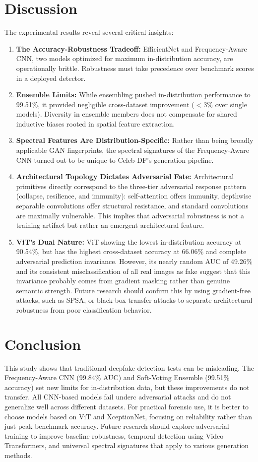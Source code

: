 \documentclass[runningheads]{llncs}
\begin{document}
\section{Discussion}
The experimental results reveal several critical insights:
\begin{enumerate}
    \item \textbf{The Accuracy-Robustness Tradeoff:} EfficientNet and Frequency-Aware CNN, two models optimized for maximum in-distribution accuracy, are operationally brittle. Robustness must take precedence over benchmark scores in a deployed detector.
    \item \textbf{Ensemble Limits:} While ensembling pushed in-distribution performance to 99.51\%, it provided negligible cross-dataset improvement ($<$3\% over single models). Diversity in ensemble members does not compensate for shared inductive biases rooted in spatial feature extraction.
    \item \textbf{Spectral Features Are Distribution-Specific:} Rather than being broadly applicable GAN fingerprints, the spectral signatures of the Frequency-Aware CNN turned out to be unique to Celeb-DF's generation pipeline.
    \item \textbf{Architectural Topology Dictates Adversarial Fate:} Architectural primitives directly correspond to the three-tier adversarial response pattern (collapse, resilience, and immunity): self-attention offers immunity, depthwise separable convolutions offer structural resistance, and standard convolutions are maximally vulnerable. This implies that adversarial robustness is not a training artifact but rather an emergent architectural feature.
    \item \textbf{ViT's Dual Nature:} ViT showing the lowest in-distribution accuracy at 90.54\%, but has the highest cross-dataset accuracy at 66.06\% and complete adversarial prediction invariance. However, its nearly random AUC of 49.26\% and its consistent misclassification of all real images as fake suggest that this invariance probably comes from gradient masking rather than genuine semantic strength. Future research should confirm this by using gradient-free attacks, such as SPSA, or black-box transfer attacks to separate architectural robustness from poor classification behavior.
\end{enumerate}

\section{Conclusion}
This study shows that traditional deepfake detection tests can be misleading. The Frequency-Aware CNN (99.84\% AUC) and Soft-Voting Ensemble (99.51\% accuracy) set new limits for in-distribution data, but these improvements do not transfer. All CNN-based models fail underc  adversarial attacks and do not generalize well across different datasets. For practical forensic use, it is better to choose models based on ViT and XceptionNet, focusing on reliability rather than just peak benchmark accuracy. Future research should explore adversarial training to improve baseline robustness, temporal detection using Video Transformers, and universal spectral signatures that apply to various generation methods.
\end{document}
